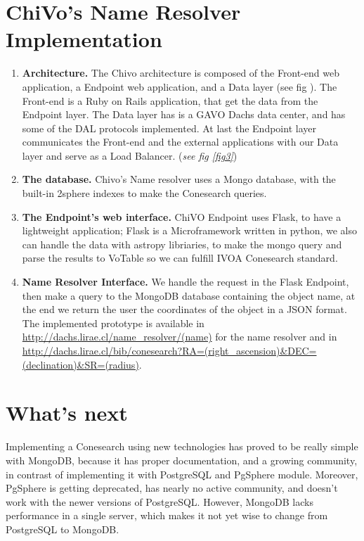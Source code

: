 \documentclass[11pt,twoside]{article}
\begin{document}
\section{ChiVo's Name Resolver Implementation}
\begin{enumerate}
  

\item  \textbf{Architecture.}  The Chivo architecture is composed of the Front-end web application, a Endpoint web application,
and a Data layer (see fig ). The Front-end is a Ruby on Rails application, that get the data from the Endpoint layer. 
The Data layer has is a GAVO Dachs data center, and has some of the DAL protocols implemented.
At last the Endpoint layer communicates the Front-end and the external applications with our Data layer and serve as a Load Balancer. (\emph{see fig \ref{fig3}})


\item  \textbf{The database.} Chivo's Name resolver uses a Mongo database, with the built-in 2sphere indexes 
to make the Conesearch queries. 

\item  \textbf{The Endpoint’s web interface.} ChiVO Endpoint uses Flask, to have a lightweight application; 
Flask is a Microframework written in python, we also can handle the data with astropy
libriaries, to make the mongo query and parse the results to VoTable so we can fulfill IVOA Conesearch standard.

\item \textbf{Name Resolver Interface.} We handle the request in the Flask Endpoint,
then make a query to the MongoDB database containing the object name, at the end we return the user the coordinates of the object 
in a JSON format. The implemented prototype is available in \url{http://dachs.lirae.cl/name_resolver/(name)} for the name resolver
and in \url{http://dachs.lirae.cl/bib/conesearch?RA=(right_ascension)&DEC=(declination)&SR=(radius)}.

\end{enumerate}

\section{What's next}
    Implementing a Conesearch using new technologies has proved to be really
simple with MongoDB, because it has proper documentation, 
and a growing community, in contrast of implementing it with PostgreSQL and
PgSphere module. Moreover,  PgSphere is getting deprecated, has nearly no active
community, and doesn't work with the newer versions of PostgreSQL. 
However,  MongoDB lacks performance in a single server, which makes it not yet
wise to change from PostgreSQL to MongoDB.
\end{document}
